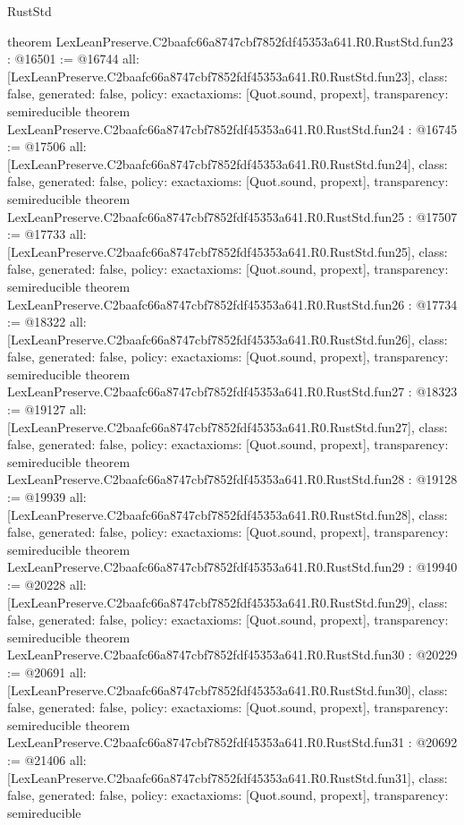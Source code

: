 \begin{lexlean}{RustStd}
\begin{coremodule}
{}
theorem LexLeanPreserve.C2baafc66a8747cbf7852fdf45353a641.R0.RustStd.fun23 : @16501 := @16744 {
  all: [LexLeanPreserve.C2baafc66a8747cbf7852fdf45353a641.R0.RustStd.fun23],
  class: false,
  generated: false,
  policy: exact{axioms: [Quot.sound, propext]},
  transparency: semireducible
}
theorem LexLeanPreserve.C2baafc66a8747cbf7852fdf45353a641.R0.RustStd.fun24 : @16745 := @17506 {
  all: [LexLeanPreserve.C2baafc66a8747cbf7852fdf45353a641.R0.RustStd.fun24],
  class: false,
  generated: false,
  policy: exact{axioms: [Quot.sound, propext]},
  transparency: semireducible
}
theorem LexLeanPreserve.C2baafc66a8747cbf7852fdf45353a641.R0.RustStd.fun25 : @17507 := @17733 {
  all: [LexLeanPreserve.C2baafc66a8747cbf7852fdf45353a641.R0.RustStd.fun25],
  class: false,
  generated: false,
  policy: exact{axioms: [Quot.sound, propext]},
  transparency: semireducible
}
theorem LexLeanPreserve.C2baafc66a8747cbf7852fdf45353a641.R0.RustStd.fun26 : @17734 := @18322 {
  all: [LexLeanPreserve.C2baafc66a8747cbf7852fdf45353a641.R0.RustStd.fun26],
  class: false,
  generated: false,
  policy: exact{axioms: [Quot.sound, propext]},
  transparency: semireducible
}
theorem LexLeanPreserve.C2baafc66a8747cbf7852fdf45353a641.R0.RustStd.fun27 : @18323 := @19127 {
  all: [LexLeanPreserve.C2baafc66a8747cbf7852fdf45353a641.R0.RustStd.fun27],
  class: false,
  generated: false,
  policy: exact{axioms: [Quot.sound, propext]},
  transparency: semireducible
}
theorem LexLeanPreserve.C2baafc66a8747cbf7852fdf45353a641.R0.RustStd.fun28 : @19128 := @19939 {
  all: [LexLeanPreserve.C2baafc66a8747cbf7852fdf45353a641.R0.RustStd.fun28],
  class: false,
  generated: false,
  policy: exact{axioms: [Quot.sound, propext]},
  transparency: semireducible
}
theorem LexLeanPreserve.C2baafc66a8747cbf7852fdf45353a641.R0.RustStd.fun29 : @19940 := @20228 {
  all: [LexLeanPreserve.C2baafc66a8747cbf7852fdf45353a641.R0.RustStd.fun29],
  class: false,
  generated: false,
  policy: exact{axioms: [Quot.sound, propext]},
  transparency: semireducible
}
theorem LexLeanPreserve.C2baafc66a8747cbf7852fdf45353a641.R0.RustStd.fun30 : @20229 := @20691 {
  all: [LexLeanPreserve.C2baafc66a8747cbf7852fdf45353a641.R0.RustStd.fun30],
  class: false,
  generated: false,
  policy: exact{axioms: [Quot.sound, propext]},
  transparency: semireducible
}
theorem LexLeanPreserve.C2baafc66a8747cbf7852fdf45353a641.R0.RustStd.fun31 : @20692 := @21406 {
  all: [LexLeanPreserve.C2baafc66a8747cbf7852fdf45353a641.R0.RustStd.fun31],
  class: false,
  generated: false,
  policy: exact{axioms: [Quot.sound, propext]},
  transparency: semireducible
}
\end{coremodule}
\end{lexlean}
